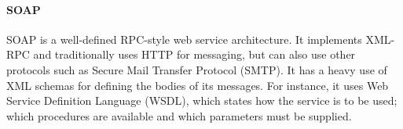\paragraph{SOAP}
SOAP is a well-defined RPC-style web service architecture.
It implements XML-RPC and traditionally uses HTTP for messaging, but can also use other protocols such as Secure Mail Transfer Protocol (SMTP).
It has a heavy use of XML schemas for defining the bodies of its messages.
For instance, it uses Web Service Definition Language (WSDL), which states how the service is to be used; which procedures are available and which parameters must be supplied.
